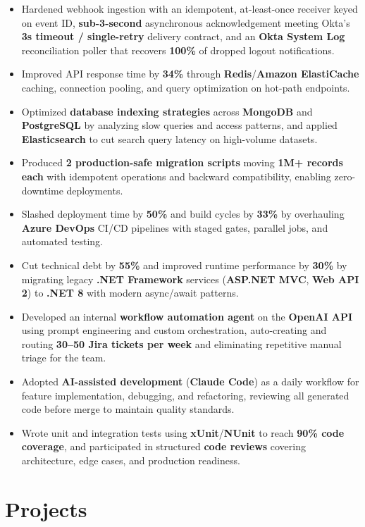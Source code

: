 \documentclass[a4paper,10pt]{article}
\begin{document}
\begin{itemize}[leftmargin=*]
    \item Hardened webhook ingestion with an idempotent, at-least-once receiver keyed on event ID, \textbf{sub-3-second} asynchronous acknowledgement meeting Okta's \textbf{3s timeout / single-retry} delivery contract, and an \textbf{Okta System Log} reconciliation poller that recovers \textbf{100\%} of dropped logout notifications.
    \item Improved API response time by \textbf{34\%} through \textbf{Redis}/\textbf{Amazon ElastiCache} caching, connection pooling, and query optimization on hot-path endpoints.
    \item Optimized \textbf{database indexing strategies} across \textbf{MongoDB} and \textbf{PostgreSQL} by analyzing slow queries and access patterns, and applied \textbf{Elasticsearch} to cut search query latency on high-volume datasets.
    \item Produced \textbf{2 production-safe migration scripts} moving \textbf{1M+ records each} with idempotent operations and backward compatibility, enabling zero-downtime deployments.
    \item Slashed deployment time by \textbf{50\%} and build cycles by \textbf{33\%} by overhauling \textbf{Azure DevOps} CI/CD pipelines with staged gates, parallel jobs, and automated testing.
    \item Cut technical debt by \textbf{55\%} and improved runtime performance by \textbf{30\%} by migrating legacy \textbf{.NET Framework} services (\textbf{ASP.NET MVC}, \textbf{Web API 2}) to \textbf{.NET 8} with modern async/await patterns.
    \item Developed an internal \textbf{workflow automation agent} on the \textbf{OpenAI API} using prompt engineering and custom orchestration, auto-creating and routing \textbf{30--50 Jira tickets per week} and eliminating repetitive manual triage for the team.
    \item Adopted \textbf{AI-assisted development} (\textbf{Claude Code}) as a daily workflow for feature implementation, debugging, and refactoring, reviewing all generated code before merge to maintain quality standards.
    \item Wrote unit and integration tests using \textbf{xUnit}/\textbf{NUnit} to reach \textbf{90\% code coverage}, and participated in structured \textbf{code reviews} covering architecture, edge cases, and production readiness.
\end{itemize}

\section*{Projects}
\end{document}
